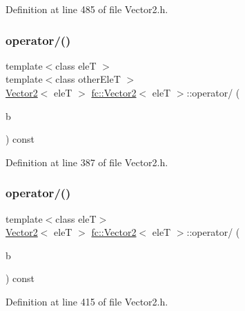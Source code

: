Definition at line 485 of file Vector2.\+h.

\mbox{\label{classfc_1_1Vector2_aa955f41047305cd02519b12a51b2dd59}} 
\subsubsection{\texorpdfstring{operator/()}{operator/()}\hspace{0.1cm}{\footnotesize\ttfamily [1/2]}}
{\footnotesize\ttfamily template$<$class eleT $>$ \\
template$<$class other\+EleT $>$ \\
\hyperlink{classfc_1_1Vector2}{Vector2}$<$ eleT $>$ \hyperlink{classfc_1_1Vector2}{fc\+::\+Vector2}$<$ eleT $>$\+::operator/ (\begin{DoxyParamCaption}\item[{const \hyperlink{classfc_1_1Vector2}{Vector2}$<$ other\+EleT $>$ \&}]{b }\end{DoxyParamCaption}) const}



Definition at line 387 of file Vector2.\+h.

\mbox{\label{classfc_1_1Vector2_a1f4f03cbeb10fd83693db84a92ae7276}} 
\subsubsection{\texorpdfstring{operator/()}{operator/()}\hspace{0.1cm}{\footnotesize\ttfamily [2/2]}}
{\footnotesize\ttfamily template$<$class eleT$>$ \\
\hyperlink{classfc_1_1Vector2}{Vector2}$<$ eleT $>$ \hyperlink{classfc_1_1Vector2}{fc\+::\+Vector2}$<$ eleT $>$\+::operator/ (\begin{DoxyParamCaption}\item[{eleT}]{b }\end{DoxyParamCaption}) const}



Definition at line 415 of file Vector2.\+h.

\mbox{\label{classfc_1_1Vector2_a3057882a89f1b623f706af68614a2fbf}} 
